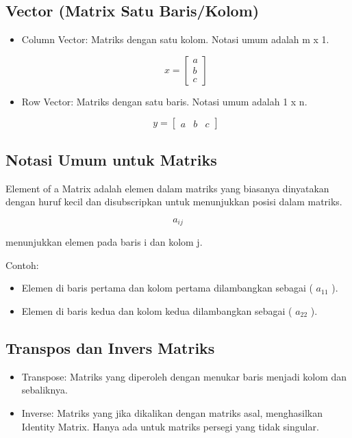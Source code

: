 \documentclass{article}
\begin{document}
\subsection{Vector (Matrix Satu Baris/Kolom)}
\begin{itemize}
    \item Column Vector: Matriks dengan satu kolom. Notasi umum adalah m x 1.

          \[ x = \begin{bmatrix} a \\ b \\ c \end{bmatrix} \]
    \item Row Vector: Matriks dengan satu baris. Notasi umum adalah 1 x n.

          \[ y = \begin{bmatrix} a & b & c \end{bmatrix} \]
\end{itemize}

\subsection{Notasi Umum untuk Matriks}
Element of a Matrix adalah elemen dalam matriks yang biasanya dinyatakan dengan huruf kecil dan disubscripkan untuk menunjukkan posisi dalam matriks.

\[a_{ij}\]

menunjukkan elemen pada baris i dan kolom j.

Contoh:
\begin{itemize}
    \item Elemen di baris pertama dan kolom pertama dilambangkan sebagai ( \(a_{11}\) ).
    \item Elemen di baris kedua dan kolom kedua dilambangkan sebagai ( \(a_{22}\) ).
\end{itemize}

\subsection{Transpos dan Invers Matriks}
\begin{itemize}
    \item Transpose: Matriks yang diperoleh dengan menukar baris menjadi kolom dan sebaliknya.
    \item Inverse: Matriks yang jika dikalikan dengan matriks asal, menghasilkan Identity Matrix. Hanya ada untuk matriks persegi yang tidak singular.
\end{itemize}
\end{document}
